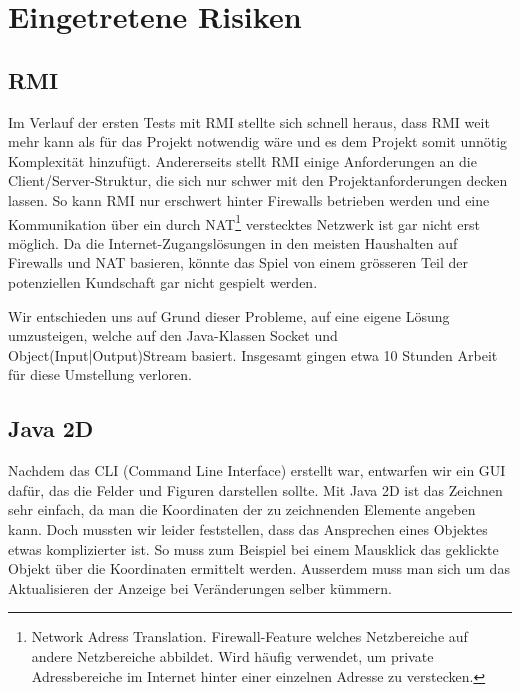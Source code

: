 \documentclass[12pt,halfparskip]{scrartcl}
\begin{document}

\clearpage
\section{Eingetretene Risiken} %
\label{eingetretene_risiken}

\subsection{RMI} %
\label{sub:rmi}

Im Verlauf der ersten Tests mit RMI stellte sich schnell heraus, dass RMI weit mehr kann als für das Projekt notwendig wäre und es dem Projekt somit unnötig Komplexität hinzufügt. Andererseits stellt RMI  einige Anforderungen an die Client/Server-Struktur, die sich nur schwer mit den Projektanforderungen decken lassen. So kann RMI nur erschwert hinter Firewalls betrieben werden und eine Kommunikation über ein durch NAT\footnote{Network Adress Translation. Firewall-Feature welches Netzbereiche auf andere Netzbereiche abbildet. Wird häufig verwendet, um private Adressbereiche im Internet hinter einer einzelnen Adresse zu verstecken.} verstecktes Netzwerk ist gar nicht erst möglich. Da die Internet-Zugangslösungen in den meisten Haushalten auf Firewalls und NAT basieren, könnte das Spiel von einem grösseren Teil der potenziellen Kundschaft gar nicht gespielt werden.

Wir entschieden uns auf Grund dieser Probleme, auf eine eigene Lösung umzusteigen, welche auf den Java-Klassen Socket und Object(Input|Output)Stream basiert. Insgesamt gingen etwa 10 Stunden Arbeit für diese Umstellung verloren.

\subsection{Java 2D} %
\label{java_2d}

Nachdem das CLI (Command Line Interface) erstellt war, entwarfen wir ein GUI dafür, das die Felder und Figuren darstellen sollte. Mit Java 2D ist das Zeichnen sehr einfach, da man die Koordinaten der zu zeichnenden Elemente angeben kann. Doch mussten wir leider feststellen, dass das Ansprechen eines Objektes etwas komplizierter ist. So muss zum Beispiel bei einem Mausklick das geklickte Objekt über die Koordinaten ermittelt werden. Ausserdem muss man sich um das Aktualisieren der Anzeige bei Veränderungen selber kümmern.
\end{document}
